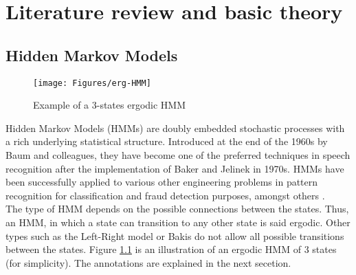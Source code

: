 \chapter{Literature review and basic theory} \label{chap:lit}

\section{Hidden Markov Models}
\begin{figure}[ht!]
	\centering
	\texttt{[image: Figures/erg-HMM]}
	\caption{Example of a 3-states ergodic HMM}{\cite{thes2011}}
	\label{fig:erg}
\end{figure}
Hidden Markov Models (HMMs) are doubly embedded stochastic processes with a rich underlying statistical structure. Introduced at the end of the 1960s by Baum and colleagues, they have become one of the preferred techniques in speech recognition after the implementation of Baker and Jelinek in 1970s. HMMs have been successfully applied to various other engineering problems in pattern recognition for classification and fraud detection purposes, amongst others \cite{tuto1989} \cite{tool2001} \cite{towa2009} \cite{twop2008}.\\
The type of HMM depends on the possible connections between the states. Thus, an HMM, in which a state can transition to any other state is said ergodic. Other types such as the Left-Right model or Bakis do not allow all possible transitions between the states. Figure \ref{fig:erg} is an illustration of an ergodic HMM of 3 states (for simplicity). The annotations are explained in the next secetion. 

